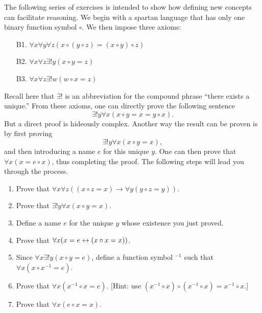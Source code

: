 \begin{exercises} \label{autosets} The following series of exercises
  is intended to show how defining new concepts can facilitate
  reasoning.  We begin with a spartan language that has only one
  binary function symbol $\circ$.  We then impose three axioms:
  \begin{enumerate}
  \item[B1.] $\forall x\forall y\forall z(x\circ (y\circ z)=(x\circ y)\circ
      z)$
  \item[B2.] $\forall x\forall z\exists !y(x\circ y=z)$
  \item[B3.] $\forall x\forall z\exists !w(w\circ x=z)$  
  \end{enumerate}   Recall
  here that $\exists !$ is an abbreviation for the compound phrase
  ``there exists a unique.''  From these axioms, one can directly
  prove the following sentence
  \[ \exists !y\forall x(x\circ y=x=y\circ x) .\] But a direct proof
  is hideously complex.  Another way the result can be proven is by
  first proving
  \[ \exists !y\forall x(x\circ y=x) ,\] and then introducing a name
  $e$ for this unique $y$.  One can then prove that
  $\forall x(x=e\circ x)$, thus completing the proof.  The following
  steps will lead you through the process.
  \begin{enumerate}
  \item Prove that $\forall x\forall z((x\circ z=x)\to \forall y(y\circ z=y))$.
  \item Prove that $\exists !y\forall x(x\circ y=x)$.
  \item Define a name $e$ for the unique $y$ whose existence you just
    proved.
  \item Prove that $\forall x(x=e\leftrightarrow (x\circ x=x))$.
  \item Since $\forall x\exists !y(x\circ y=e)$, define a function
    symbol $^{-1}$ such that $\forall x(x\circ x^{-1}=e)$.
  \item Prove that $\forall x(x^{-1}\circ x=e)$.  [Hint: use
    $(x^{-1}\circ x)\circ (x^{-1}\circ x)=x^{-1}\circ x$.]
  \item Prove that $\forall x(e\circ x=x)$.
\end{enumerate}
\end{exercises}



